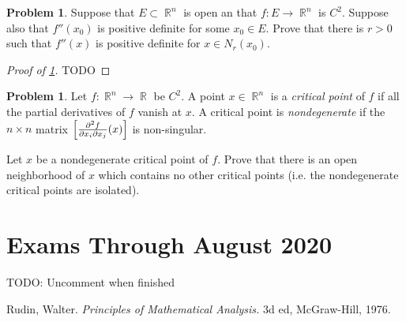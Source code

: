 \documentclass[english]{article}
\DeclareMathOperator{\R}{\mathbb{R}}
\theoremstyle{definition}
\newtheorem{problem}[theorem]{Problem}
\begin{document}
\begin{problem}
    \label{prob:small_ball}
    Suppose that $E \subset \R^n$ is open an that $f: E \to \R^n$ is $C^2$. Suppose also that $f''(x_0)$ is positive definite for some $x_0 \in E$. Prove that there is $r > 0$ such that $f''(x)$ is positive definite for $x \in N_r(x_0)$.
\end{problem}

\begin{proof}[Proof of \cref{prob:small_ball}]
    TODO
\end{proof}

\begin{problem}
    Let $f: \R^n \to \R$ be $C^2$. A point $x \in \R^n$ is a \textit{critical point} of $f$ if all the partial derivatives of $f$ vanish at $x$. A critical point is \textit{nondegenerate} if the $n \times n$ matrix $\left[ {\partial^2 f \over \partial x_i \partial x_j } (x) \right]$ is non-singular. 

    Let $x$ be a nondegenerate critical point of $f$. Prove that there is an open neighborhood of $x$ which contains no other critical points (i.e. the nondegenerate critical points are isolated).
\end{problem}


\pagebreak

\section{Exams Through August 2020}
TODO: Uncomment when finished
% 

\pagebreak

\begin{thebibliography}{9}
    Rudin, Walter. \textit{Principles of Mathematical Analysis.} 3d ed, McGraw-Hill, 1976.
\end{thebibliography}
\end{document}

